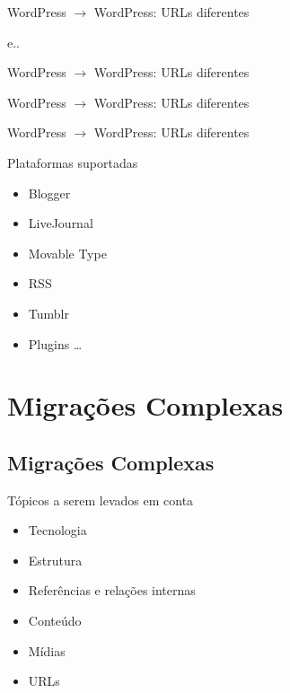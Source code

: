 \documentclass{beamer}
\begin{document}
\begin{frame}[fragile]{WordPress $\rightarrow$ WordPress: URLs diferentes}
  
  e..
\end{frame}

\begin{frame}[fragile]{WordPress $\rightarrow$ WordPress: URLs diferentes}
  
  \pause
  
  \pause
  
  \pause
  
\end{frame}

\begin{frame}[fragile]{WordPress $\rightarrow$ WordPress: URLs diferentes}
  
  \pause
  
\end{frame}

\begin{frame}[fragile]{WordPress $\rightarrow$ WordPress: URLs diferentes}
  
\end{frame}

\begin{frame}{Plataformas suportadas}
\begin{itemize}
  \pause
  \item Blogger
  \item LiveJournal
  \item Movable Type
  \item RSS
  \item Tumblr
  \item Plugins \ldots
\end{itemize}
\end{frame}

\section{Migrações Complexas}
\subsection{Migrações Complexas}

\begin{frame}{Tópicos a serem levados em conta}
  \begin{itemize}
    \pause \item Tecnologia
    \pause \item Estrutura
    \pause \item Referências e relações internas
    \pause \item Conteúdo
    \pause \item Mídias
    \pause \item URLs
  \end{itemize}
\end{frame}
\end{document}
